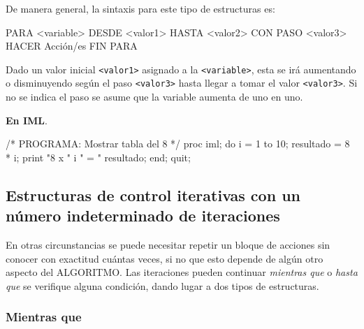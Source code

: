 \documentclass[
]{book}
\newenvironment{Shaded}{\begin{snugshade}}{\end{snugshade}}
\newcommand{\NormalTok}[1]{#1}
\begin{document}
De manera general, la sintaxis para este tipo de estructuras es:

\begin{Shaded}
\begin{Highlighting}[]
\NormalTok{PARA \textless{}variable\textgreater{} DESDE \textless{}valor1\textgreater{} HASTA \textless{}valor2\textgreater{} CON PASO \textless{}valor3\textgreater{} HACER}
\NormalTok{    Acción/es}
\NormalTok{FIN PARA}
\end{Highlighting}
\end{Shaded}

Dado un valor inicial \texttt{\textless{}valor1\textgreater{}} asignado a la \texttt{\textless{}variable\textgreater{}}, esta se irá aumentando o disminuyendo según el paso \texttt{\textless{}valor3\textgreater{}} hasta llegar a tomar el valor \texttt{\textless{}valor3\textgreater{}}. Si no se indica el paso se asume que la variable aumenta de uno en uno.

\textbf{En IML}.

\begin{Shaded}
\begin{Highlighting}[]
\NormalTok{/* PROGRAMA: Mostrar tabla del 8 */}
\NormalTok{proc iml;}
\NormalTok{    do i = 1 to 10;}
\NormalTok{        resultado = 8 * i;}
\NormalTok{        print "8 x " i " = " resultado;}
\NormalTok{    end;}
\NormalTok{quit;}
\end{Highlighting}
\end{Shaded}

\hypertarget{estructuras-de-control-iterativas-con-un-nuxfamero-indeterminado-de-iteraciones}{%
\subsection{Estructuras de control iterativas con un número indeterminado de iteraciones}\label{estructuras-de-control-iterativas-con-un-nuxfamero-indeterminado-de-iteraciones}}

En otras circunstancias se puede necesitar repetir un bloque de acciones sin conocer con exactitud cuántas veces, si no que esto depende de algún otro aspecto del ALGORITMO. Las iteraciones pueden continuar \emph{mientras que} o \emph{hasta que} se verifique alguna condición, dando lugar a dos tipos de estructuras.

\hypertarget{mientras-que}{%
\subsubsection{Mientras que}\label{mientras-que}}
\end{document}
